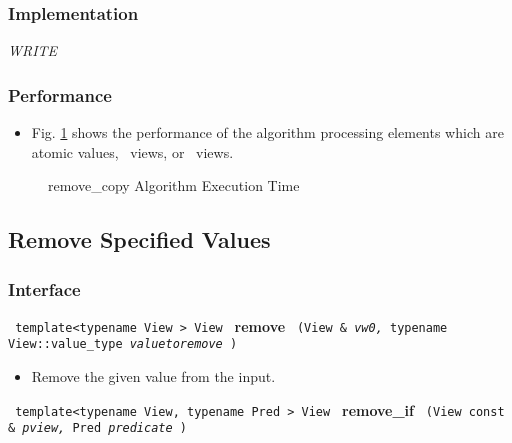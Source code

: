 \subsubsection{Implementation} %

\textit{WRITE}

\subsubsection{Performance} %

\begin{itemize}
\item
Fig. \ref{fig:remv-copy-alg-exec-exper}
shows the performance of the algorithm processing
elements which are atomic values, \stl\ views, or \stapl\ views.
\end{itemize}

\begin{figure}[p]
\caption{remove\_copy Algorithm Execution Time}
\label{fig:remv-copy-alg-exec-exper}
\end{figure}


\subsection{Remove Specified Values} \label{sec-remv-remove_if}

\subsubsection{Interface} %

\noindent
\texttt{%
template<typename View >
\newline
View 
}
\newline
\textbf{remove}%
\texttt{%
(View \&
\textit{vw0,}%
typename View::value\_type 
\textit{valuetoremove}%
)
}

\begin{itemize}
\item
Remove the given value from the input. 
\end{itemize}

\noindent
\texttt{%
template<typename View, typename Pred >
\newline
View 
}
\newline
\textbf{remove\_if}%
\texttt{%
(View const \&
\textit{pview,}%
Pred 
\textit{predicate}%
)
}

